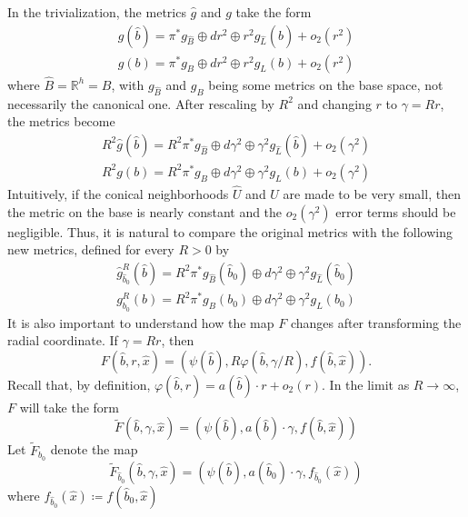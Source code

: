 \documentclass[12pt, reqno]{amsart}
\theoremstyle{plain} %
\theoremstyle{definition}
\theoremstyle{remark}
\numberwithin{equation}{section}
\newcommand{\dom}[1]{\hat{#1}}
\newcommand{\field}[1]{\mathbb{#1}}
\newcommand{\R}{\field{R}}
\newcommand{\hdim}{h} %
\begin{document}
In the trivialization, the metrics \(\dom{g}\) and \(g\) take the form
\begin{gather*}
    \dom{g}(\dom{b}) = \pi^*g_{\dom{B}} \oplus dr^2 \oplus r^2 g_{\dom{L}}(\dom{b}) + o_2(r^2)\\
    g(b) = \pi^*g_B \oplus dr^2 \oplus r^2 g_L(b) + o_2(r^2)
\end{gather*}
where \(\dom{B} = \R^\hdim = B\), with \(g_{\dom{B}}\) and \(g_B\) being some metrics on the base space, not necessarily the canonical one.
After rescaling by \(R^2\) and changing \(r\) to \(\gamma = Rr\), the metrics become
\begin{gather*}
    R^2 \dom{g}(\dom{b}) = R^2 \pi^*g_{\dom{B}} \oplus d\gamma^2 \oplus \gamma^2 g_{\dom{L}}(\dom{b}) + o_2(\gamma^2)\\
    R^2 g(b) = R^2 \pi^*g_B \oplus d\gamma^2 \oplus \gamma^2 g_L(b) + o_2(\gamma^2)
\end{gather*}
Intuitively, if the conical neighborhoods \(\dom{U}\) and \(U\) are made to be very small, then the metric on the base is nearly constant and the \(o_2(\gamma^2)\) error terms should be negligible.
Thus, it is natural to compare the original metrics with the following new metrics, defined for every \(R > 0\) by
\begin{gather*}
    \dom{g}_{\dom{b}_0}^R(\dom{b}) = R^2 \pi^*g_{\dom{B}}(\dom{b}_0) \oplus d\gamma^2 \oplus \gamma^2 g_{\dom{L}}(\dom{b}_0) \\
    g_{b_0}^R(b) = R^2 \pi^*g_B(b_0) \oplus d\gamma^2 \oplus \gamma^2 g_L(b_0)
\end{gather*}
It is also important to understand how the map \(F\) changes after transforming the radial coordinate.
If \(\gamma = Rr\), then
\begin{equation*}
    F(\dom{b},r,\dom{x}) = (\psi(\dom{b}), R\varphi(\dom{b},\gamma/R), f(\dom{b},\dom{x})).
\end{equation*}
Recall that, by definition, \(\varphi(\dom{b}, r) = a(\dom{b}) \cdot r + o_2(r)\).
In the limit as \(R \to \infty\), \(F\) will take the form
\begin{equation*}
    \widetilde{F}(\dom{b}, \gamma, \dom{x}) = (\psi(\dom{b}), a(\dom{b}) \cdot \gamma, f(\dom{b},\dom{x}))
\end{equation*}
Let \(\widetilde{F}_{b_0}\) denote the map
\begin{equation*}
    \widetilde{F}_{\dom{b}_0}(\dom{b}, \gamma, \dom{x}) = (\psi(\dom{b}), a(\dom{b}_0) \cdot \gamma, f_{\dom{b}_0}(\dom{x}))
\end{equation*}
where \(f_{\dom{b}_0}(\dom{x}) \coloneqq f(\dom{b}_0, \dom{x})\)
\end{document}
